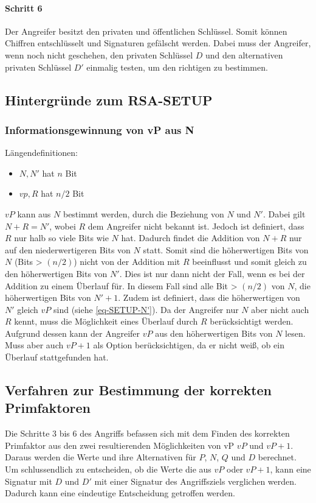             \paragraph{Schritt 6} \label{sec-Schritt-Ang 6} Der Angreifer besitzt den privaten und öffentlichen Schlüssel. Somit können Chiffren entschlüsselt und Signaturen gefälscht werden. Dabei muss der Angreifer, wenn noch nicht geschehen, den privaten Schlüssel $D$ und den alternativen privaten Schlüssel $D'$ einmalig testen, um den richtigen zu bestimmen.

        \subsection{Hintergründe zum RSA-SETUP}
            \subsubsection{Informationsgewinnung von vP aus N} \label{sec-SETUP-vP_from_N}
            Längendefinitionen:
            \begin{itemize}
                \item $N, N'$ hat $n$ Bit
                \item $vp, R$ hat $n/2$ Bit
            \end{itemize}
            $vP$ kann aus $N$ bestimmt werden, durch die Beziehung von $N$ und $N'$. Dabei gilt $N + R = N'$, wobei $R$ dem Angreifer nicht bekannt ist. Jedoch ist definiert, dass $R$ nur halb so viele Bits wie $N$ hat. Dadurch findet die Addition von $N + R$ nur auf den niederwertigeren Bits von $N$ statt. Somit sind die höherwertigen Bits von $N$ (Bits > $(n/2)$) nicht von der Addition mit $R$ beeinflusst und somit gleich zu den höherwertigen Bits von $N'$. Dies ist nur dann nicht der Fall, wenn es bei der Addition zu einem Überlauf für. In diesem Fall sind alle Bit > $(n/2)$ von $N$, die höherwertigen Bits von $N' + 1$.
            Zudem ist definiert, dass die höherwertigen von $N'$ gleich $vP$ sind (siehe \ref{eq-SETUP-N'}).
            Da der Angreifer nur $N$ aber nicht auch $R$ kennt, muss die Möglichkeit eines Überlauf durch $R$ berücksichtigt werden. 
            Aufgrund dessen kann der Angreifer $vP$ aus den höherwertigen Bits von $N$ lesen. Muss aber auch $vP + 1$ als Option berücksichtigen, da er nicht weiß, ob ein Überlauf stattgefunden hat.               

            \subsection{Verfahren zur Bestimmung der korrekten Primfaktoren}
                Die Schritte 3 bis 6 des Angriffs befassen sich mit dem Finden des korrekten Primfaktor aus den zwei resultierenden Möglichkeiten von vP $vP$ und $vP+1$. Daraus werden die Werte und ihre Alternativen für $P$, $N$, $Q$ und $D$ berechnet. 
                Um schlussendlich zu entscheiden, ob die Werte die aus $vP$ oder $vP+1$, kann eine Signatur mit $D$ und $D'$ mit einer Signatur des Angriffsziels verglichen werden. Dadurch kann eine eindeutige Entscheidung getroffen werden. 

